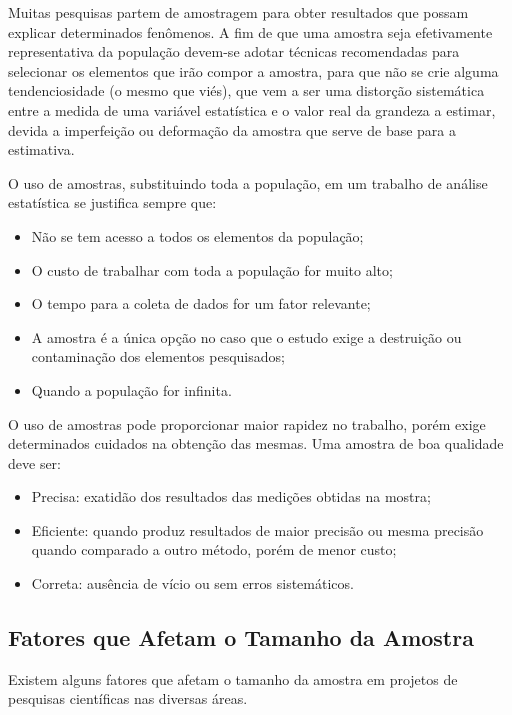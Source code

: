  

Muitas pesquisas partem de amostragem para obter resultados que possam explicar determinados fenômenos. A fim de que uma amostra seja efetivamente representativa da população devem-se adotar técnicas recomendadas para selecionar os elementos que irão compor a amostra, para que não se crie alguma tendenciosidade (o mesmo que viés), que vem a ser uma distorção sistemática entre a medida de uma variável estatística e o valor real da grandeza a estimar, devida a imperfeição ou deformação da amostra que serve de base para a estimativa.\vskip0.3cm


O uso de amostras, substituindo toda a população, em um trabalho de análise estatística se justifica sempre que:

\begin{itemize}
\item Não se tem acesso a todos os elementos da população;
\item O custo de trabalhar com toda a população for muito alto;
\item O tempo para a coleta de dados for um fator relevante;
\item A amostra é a única opção no caso que o estudo exige a destruição ou contaminação dos elementos pesquisados;
\item Quando a população for infinita.
\end{itemize}

O uso de amostras pode proporcionar maior rapidez no trabalho, porém exige determinados cuidados na obtenção das mesmas. Uma amostra de boa qualidade deve ser:


\begin{itemize}
 \item Precisa: exatidão dos resultados das medições obtidas na mostra;
 \item Eficiente: quando produz resultados de maior precisão ou mesma precisão quando comparado a outro método, porém de menor custo;
 \item Correta: ausência de vício ou sem erros sistemáticos.
\end{itemize}

\newpage
\subsection{Fatores que Afetam o Tamanho da Amostra} 
Existem alguns fatores que afetam o tamanho da amostra em projetos de pesquisas científicas nas diversas áreas.

